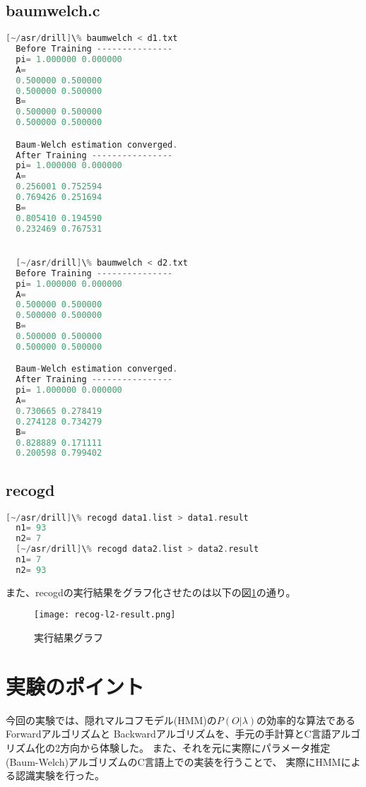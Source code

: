 \documentclass[11pt,a4paper, uplatex]{jsarticle}
\begin{document}
\subsection{baumwelch.c}

\begin{lstlisting}[language=c, breaklines = true, caption=\texttt{baumwelch}実行結果]
  [~/asr/drill]\% baumwelch < d1.txt
  Before Training ---------------
  pi= 1.000000 0.000000
  A=
  0.500000 0.500000
  0.500000 0.500000
  B=
  0.500000 0.500000
  0.500000 0.500000

  Baum-Welch estimation converged.
  After Training ----------------
  pi= 1.000000 0.000000
  A=
  0.256001 0.752594
  0.769426 0.251694
  B=
  0.805410 0.194590
  0.232469 0.767531


  [~/asr/drill]\% baumwelch < d2.txt
  Before Training ---------------
  pi= 1.000000 0.000000
  A=
  0.500000 0.500000
  0.500000 0.500000
  B=
  0.500000 0.500000
  0.500000 0.500000

  Baum-Welch estimation converged.
  After Training ----------------
  pi= 1.000000 0.000000
  A=
  0.730665 0.278419
  0.274128 0.734279
  B=
  0.828889 0.171111
  0.200598 0.799402
\end{lstlisting}

\subsection{recogd}

\begin{lstlisting}[language=c, breaklines = true, caption=\texttt{recogd}実行結果]
  [~/asr/drill]\% recogd data1.list > data1.result
  n1= 93
  n2= 7
  [~/asr/drill]\% recogd data2.list > data2.result
  n1= 7
  n2= 93
\end{lstlisting}

また、recogdの実行結果をグラフ化させたのは以下の図\ref{fig:ps}の通り。

\begin{figure}[h]
  \begin{center}
    \texttt{[image: recog-l2-result.png]}
    \caption{実行結果グラフ}
    \label{fig:ps}
  \end{center}
\end{figure}


\section{実験のポイント}

今回の実験では、隠れマルコフモデル(HMM)の$P(O|λ)$の効率的な算法であるForwardアルゴリズムと
Backwardアルゴリズムを、手元の手計算とC言語アルゴリズム化の2方向から体験した。
また、それを元に実際にパラメータ推定(Baum-Welch)アルゴリズムのC言語上での実装を行うことで、
実際にHMMによる認識実験を行った。
\end{document}
